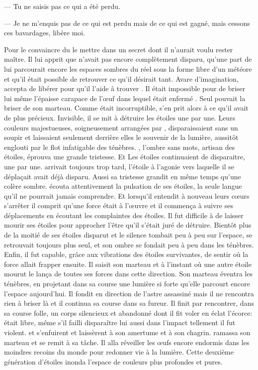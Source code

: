 --- Tu ne saisis pas ce qui a été perdu. 

--- Je ne m'enquis pas de ce qui est perdu mais de ce qui est gagné, mais cessons ces bavardages, libère moi.


Pour le convaincre \Ogo du le mettre dans un secret dont il n'aurait voulu rester maître. Il lui apprit que \Mey n'avait pas encore complètement disparu, qu'une part de lui parcourait encore les espaces sombres du réel sous la forme libre d'un météore et qu'il était possible de retrouver ce qu'il désirait tant. Avare d'imagination, \Shuru accepta de libérer \Ogo pour qu'il l'aide à trouver \Drisst. Il était impossible pour \Shuru de briser lui même l'épaisse carapace de l'œuf dans lequel était enfermé \Ogo. Seul \Carac pouvait la briser de son marteau. Comme \Carac était incorruptible, \Shuru s'en prit alors à ce qu'il avait de plus précieux. Invisible, il se mit à détruire les étoiles une par une. Leurs couleurs majestueuses, soigneusement arrangées par \Carac, disparaissaient sans un soupir et laissaient seulement derrière elles le souvenir de la lumière, aussitôt englouti par le flot infatigable des ténèbres. \Carac, l'ombre sans mots, artisan des étoiles, éprouva une grande tristesse. Et Les étoiles continuaient de disparaitre, une par une. \Carac arrivait toujours trop tard, l'étoile à l'agonie vers laquelle il se déplaçait avait déjà disparu. Aussi sa tristesse grandit en même temps qu'une colère sombre. \Carac écouta attentivement la pulsation de ses étoiles, la seule langue qu'il ne pourrait jamais comprendre. Et lorsqu'il entendit à nouveau leurs cœurs s'arrêter il comprit qu'une force était à l'œuvre et il commença à suivre ses déplacements en écoutant les complaintes des étoiles. Il fut difficile à \Carac de laisser mourir ses étoiles pour approcher l'être qu'il s'était juré de détruire. Bientôt plus de la moitié de ses étoiles disparut et le silence tombait peu à peu sur l'espace, \Carac se retrouvait toujours plus seul, et son ombre se fondait peu à peu dans les ténèbres. Enfin, il fut capable, grâce aux vibrations des étoiles survivantes, de sentir où la force allait frapper ensuite. Il saisit son marteau et à l'instant où une autre étoile mourut le lança de toutes ses forces dans cette direction. Son marteau éventra les ténèbres, en projetant dans sa course une lumière si forte qu'elle parcourt encore l'espace aujourd'hui. Il fondit en direction de l'astre assassiné mais il ne rencontra rien à briser là et il continua sa course dans sa fureur. Il finit par rencontrer, dans sa course folle, un corps silencieux et abandonné dont il fit voler en éclat l'écorce: \Ogo était libre, même s'il failli disparaître lui aussi dans l'impact tellement il fut violent. \Ogo et \Shuru s'enfuirent et laissèrent \Carac à son amertume et à son chagrin. \Carac ramassa son marteau et se remit à sa tâche. Il alla réveiller les œufs encore endormis dans les moindres recoins du monde pour redonner vie à la lumière. Cette deuxième génération d'étoiles inonda l'espace de couleurs plus profondes et pures. 
